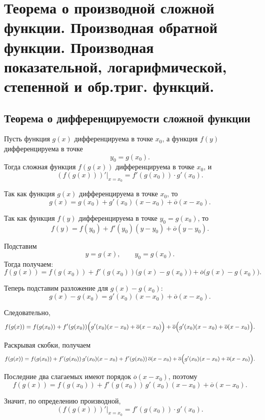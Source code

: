 \section{Теорема о производной сложной функции. Производная обратной функции. Производная показательной, логарифмической, степенной и обр.триг. функций.}



\subsection{Теорема о дифференцируемости сложной функции}

\begin{theorem}
Пусть функция $g(x)$ дифференцируема в точке $x_0$, а функция $f(y)$
дифференцируема в точке
\[
y_0 = g(x_0).
\]
Тогда сложная функция $f(g(x))$ дифференцируема в точке $x_0$, и
\[
\left.(f(g(x)))'\right|_{x=x_0} = f'(g(x_0)) \cdot g'(x_0).
\]
\end{theorem}

\begin{Proof}
Так как функция $g(x)$ дифференцируема в точке $x_0$, то
\[
g(x) = g(x_0) + g'(x_0)(x-x_0) + \overline{o}(x-x_0).
\]

Так как функция $f(y)$ дифференцируема в точке $y_0 = g(x_0)$, то
\[
f(y) = f(y_0) + f'(y_0)(y-y_0) + \overline{o}(y-y_0).
\]

Подставим
\[
y = g(x), \qquad y_0 = g(x_0).
\]
Тогда получаем:
\[
f(g(x))
=
f(g(x_0))
+
f'(g(x_0))\bigl(g(x)-g(x_0)\bigr)
+
\overline{o}\bigl(g(x)-g(x_0)\bigr).
\]

Теперь подставим разложение для $g(x)-g(x_0)$:
\[
g(x)-g(x_0)
=
g'(x_0)(x-x_0) + \overline{o}(x-x_0).
\]

Следовательно,
\[
f(g(x))
=
f(g(x_0))
+
f'(g(x_0))
\Bigl(
g'(x_0)(x-x_0) + \overline{o}(x-x_0)
\Bigr)
+
\overline{o}\Bigl(
g'(x_0)(x-x_0) + \overline{o}(x-x_0)
\Bigr).
\]

Раскрывая скобки, получаем
\[
f(g(x))
=
f(g(x_0))
+
f'(g(x_0))\,g'(x_0)(x-x_0)
+
f'(g(x_0))\,\overline{o}(x-x_0)
+
\overline{o}\Bigl(
g'(x_0)(x-x_0) + \overline{o}(x-x_0)
\Bigr).
\]

Последние два слагаемых имеют порядок $\overline{o}(x-x_0)$, поэтому
\[
f(g(x))
=
f(g(x_0))
+
f'(g(x_0))\,g'(x_0)(x-x_0)
+
\overline{o}(x-x_0).
\]

Значит, по определению производной,
\[
\left.(f(g(x)))'\right|_{x=x_0}
=
f'(g(x_0)) \cdot g'(x_0).
\]
\end{Proof}















